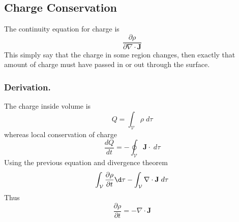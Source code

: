 \documentclass[../../../main.tex]{subfiles}
\begin{document}
\subsection*{Charge Conservation}
The continuity equation for charge is 
\begin{equation*}
    \frac{\partial \rho}{\partial \nabla \cdot \mathbf{J}}
\end{equation*}
This simply say that the charge in some region changes, then exactly that amount of charge must have passed in or out through the surface.

\subsubsection*{Derivation.}
The charge inside volume is 
\begin{equation*}
    Q=\int_\mathcal{V}\rho\; d\tau
\end{equation*}
whereas local conservation of charge
\begin{equation*}
    \frac{dQ}{dt}=-\oint_\mathcal{V}\mathbf{J}\cdot\;d\tau
\end{equation*}
Using the previous equation and divergence theorem
\begin{equation*}
   \int_\mathcal{V}\frac{\partial \rho}{\partial t}\d\tau -\int_\mathcal{V}\nabla\cdot \mathbf{J}\;d\tau 
\end{equation*}
Thus 
\begin{equation*}
    \frac{\partial\rho}{\partial t}=-\nabla\cdot\mathbf{J}
\end{equation*}
\end{document}

